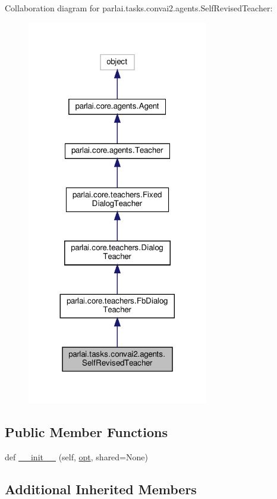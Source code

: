 Collaboration diagram for parlai.\+tasks.\+convai2.\+agents.\+Self\+Revised\+Teacher\+:
\nopagebreak
\begin{figure}[H]
\begin{center}
\leavevmode
\includegraphics[width=224pt]{classparlai_1_1tasks_1_1convai2_1_1agents_1_1SelfRevisedTeacher__coll__graph}
\end{center}
\end{figure}
\subsection*{Public Member Functions}
\begin{DoxyCompactItemize}
\item 
def \hyperlink{classparlai_1_1tasks_1_1convai2_1_1agents_1_1SelfRevisedTeacher_a7e0e99704aa5772d371e1b03dfe5cf5a}{\+\_\+\+\_\+init\+\_\+\+\_\+} (self, \hyperlink{classparlai_1_1core_1_1teachers_1_1FbDialogTeacher_af7a9ec497b9cd0292d7b8fa220da7c28}{opt}, shared=None)
\end{DoxyCompactItemize}
\subsection*{Additional Inherited Members}


